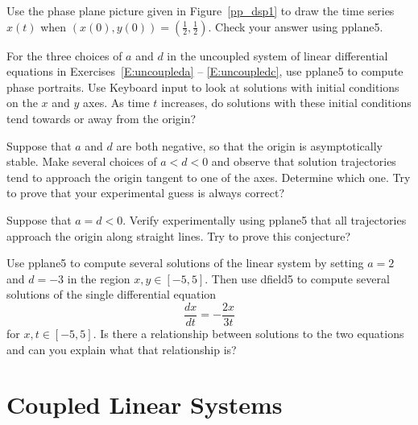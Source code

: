 \documentclass{ximera}
\begin{document}
\begin{exercise} \label{c3.4.3}
Use the phase plane picture given in Figure~\ref{pp_dsp1} to
draw the time series $x(t)$ when $(x(0),y(0)) =
(\frac{1}{2},\frac{1}{2})$.  Check your answer using {\sf
pplane5}.
\end{exercise}

\CEXER


\begin{exercise} \label{c3.4.4}
For the three choices of $a$ and $d$ in the uncoupled system of
linear differential equations in Exercises~\ref{E:uncoupleda} -- 
\ref{E:uncoupledc}, use {\sf pplane5}
to compute phase portraits.  Use {\sf Keyboard input} to look at
solutions with initial conditions on the $x$ and $y$ axes.  As time
$t$ increases, do solutions with these initial conditions tend towards 
or away from the origin?
\end{exercise}

\begin{exercise} \label{c3.4.5}
Suppose that $a$ and $d$ are both negative, so that the origin
is asymptotically stable.  Make several choices of $a<d<0$ and
observe that solution trajectories tend to approach the origin
tangent to one of the axes.  Determine which one.  Try to prove
that your experimental guess is always correct?
\end{exercise}

\begin{exercise} \label{c3.4.6}
Suppose that $a=d<0$.  Verify experimentally using {\sf pplane5}
that all trajectories approach the origin along straight lines.
Try to prove this conjecture?
\end{exercise}

\begin{exercise} \label{c3.4.7}
Use {\sf pplane5} to compute several solutions of the linear system by
setting $a=2$ and $d=-3$ in the region $x,y\in[-5,5]$.  Then use
{\sf dfield5} to compute several solutions of the single differential
equation
\[
\frac{dx}{dt} = -\frac{2x}{3t}
\]
for $x,t\in[-5,5]$.  Is there a relationship between solutions to the
two equations and can you explain what that relationship is?
\end{exercise}



\section{Coupled Linear Systems}  \label{s:3.5}
\end{document}

